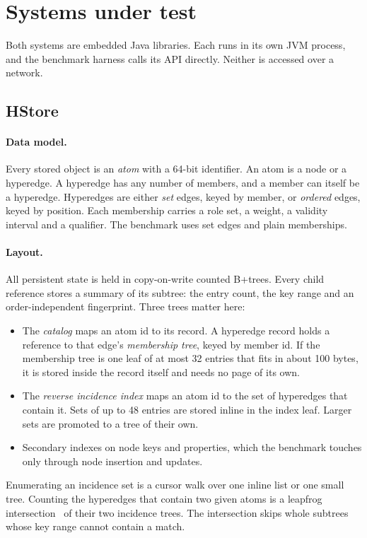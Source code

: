 \section{Systems under test}
\label{sec:systems}

Both systems are embedded Java libraries. Each runs in its own JVM process, and the benchmark harness calls its API directly. Neither is accessed over a network.

\subsection{HStore}

\paragraph{Data model.} Every stored object is an \emph{atom} with a 64-bit identifier. An atom is a node or a hyperedge. A hyperedge has any number of members, and a member can itself be a hyperedge. Hyperedges are either \emph{set} edges, keyed by member, or \emph{ordered} edges, keyed by position. Each membership carries a role set, a weight, a validity interval and a qualifier. The benchmark uses set edges and plain memberships.

\paragraph{Layout.} All persistent state is held in copy-on-write counted B+trees. Every child reference stores a summary of its subtree: the entry count, the key range and an order-independent fingerprint. Three trees matter here:
\begin{itemize}
\item The \emph{catalog} maps an atom id to its record. A hyperedge record holds a reference to that edge's \emph{membership tree}, keyed by member id. If the membership tree is one leaf of at most 32 entries that fits in about 100 bytes, it is stored inside the record itself and needs no page of its own.
\item The \emph{reverse incidence index} maps an atom id to the set of hyperedges that contain it. Sets of up to 48 entries are stored inline in the index leaf. Larger sets are promoted to a tree of their own.
\item Secondary indexes on node keys and properties, which the benchmark touches only through node insertion and updates.
\end{itemize}
Enumerating an incidence set is a cursor walk over one inline list or one small tree. Counting the hyperedges that contain two given atoms is a leapfrog intersection~\cite{leapfrog} of their two incidence trees. The intersection skips whole subtrees whose key range cannot contain a match.

